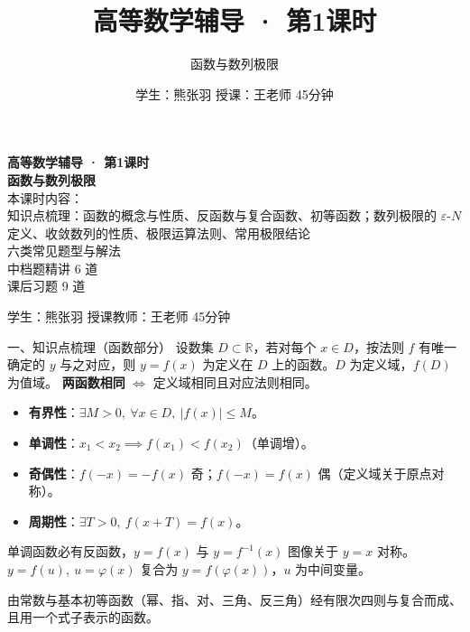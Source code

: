 \documentclass[aspectratio=169,11pt]{beamer}
\title{高等数学辅导 · 第1课时}
\subtitle{函数与数列极限}
\author{学生：熊张羽 \quad 授课：王老师 \quad 45分钟}
\date{}
\begin{document}
\begin{frame}
\vspace{1.2cm}
{\color{navy}\bfseries\Huge 高等数学辅导 · 第1课时}\\[1.2em]
{\color{blacktext}\bfseries\LARGE 函数与数列极限}\\[1.6em]
{\color{graytext}
本课时内容：\\[0.3em]
知识点梳理：函数的概念与性质、反函数与复合函数、初等函数；数列极限的 $\varepsilon$-$N$ 定义、收敛数列的性质、极限运算法则、常用极限结论\\
六类常见题型与解法\\
中档题精讲 6 道\\
课后习题 9 道
}
\vspace{1.4em}

{\color{graytext} 学生：熊张羽 \quad 授课教师：王老师 \quad 45分钟}
\end{frame}

\begin{frame}{一、知识点梳理（函数部分）}
设数集 $D\subset\mathbb{R}$，若对每个 $x\in D$，按法则 $f$ 有唯一确定的 $y$ 与之对应，则 $y=f(x)$ 为定义在 $D$ 上的函数。$D$ 为定义域，$f(D)$ 为值域。
\textbf{两函数相同} $\iff$ 定义域相同且对应法则相同。

\begin{itemize}
  \item \textbf{有界性}：$\exists M>0,\ \forall x\in D,\ |f(x)|\le M$。
  \item \textbf{单调性}：$x_1<x_2\implies f(x_1)<f(x_2)$（单调增）。
  \item \textbf{奇偶性}：$f(-x)=-f(x)$ 奇；$f(-x)=f(x)$ 偶（定义域关于原点对称）。
  \item \textbf{周期性}：$\exists T>0,\ f(x+T)=f(x)$。
\end{itemize}

单调函数必有反函数，$y=f(x)$ 与 $y=f^{-1}(x)$ 图像关于 $y=x$ 对称。
$y=f(u),\ u=\varphi(x)$ 复合为 $y=f(\varphi(x))$，$u$ 为中间变量。

由常数与基本初等函数（幂、指、对、三角、反三角）经有限次四则与复合而成、且用一个式子表示的函数。
\end{frame}
\end{document}
